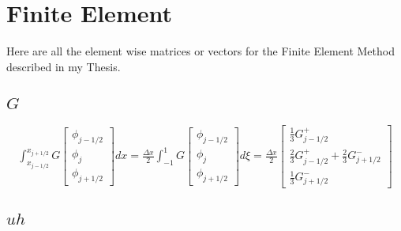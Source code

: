 \documentclass[12pt]{article}
\begin{document}
\section{Finite Element}
Here are all the element wise matrices or vectors for the Finite Element Method described in my Thesis. 

\subsection{$G$}
\begin{multline*}
\int_{x_{j-1/2}}^{x_{j+1/2}}G\left[\begin{array}{c}\phi_{j-1/2} \\\phi_{j}\\\phi_{j+1/2} \end{array}\right]  dx =  \frac{\Delta x}{2}\int_{-1}^{1}G\left[\begin{array}{c}\phi_{j-1/2} \\\phi_{j}\\\phi_{j+1/2} \end{array}\right]  d\xi = 
\frac{\Delta x}{2} \left[\begin{array}{c} \frac{1}{3} G^+_{j - 1/2} \\ \frac{2}{3} G^+_{j - 1/2} + \frac{2}{3} G^-_{j + 1/2} \\ \frac{1}{3} G^-_{j + 1/2} \end{array}\right]
\end{multline*}

\subsection{$uh$}
\end{document}
